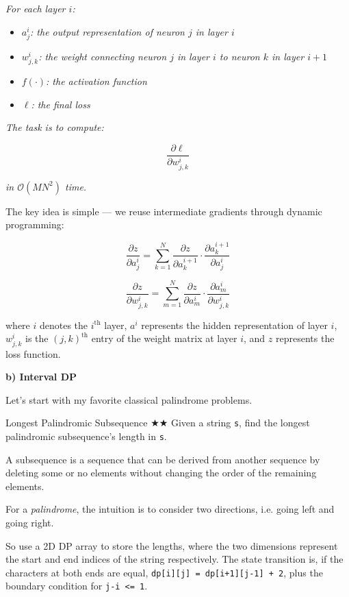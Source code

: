 \documentclass{article}
\begin{document}
\emph{For each layer $i$:}

\begin{itemize}
    \item \emph{$a^i_j$: the output representation of neuron $j$ in layer $i$}
    \item \emph{$w^i_{j,k}$: the weight connecting neuron $j$ in layer $i$ to neuron $k$ in layer $i+1$}
    \item \emph{$f(\cdot)$: the activation function}
    \item \emph{$\ell$: the final loss}
\end{itemize}

\emph{The task is to compute:}

$$
\frac{\partial \ell}{\partial w^i_{j,k}}
$$

\emph{in $\mathcal O(MN^2)$ time.}

The key idea is simple --- we reuse intermediate gradients through dynamic programming:

$$
\frac{\partial z}{\partial a^i_j}
=
\sum_{k=1}^{N}
\frac{\partial z}{\partial a^{i+1}_k}
\cdot
\frac{\partial a^{i+1}_k}{\partial a^i_j}
$$

$$
\frac{\partial z}{\partial w^i_{j,k}}
=
\sum_{m=1}^{N}
\frac{\partial z}{\partial a^i_m}
\cdot
\frac{\partial a^i_m}{\partial w^i_{j,k}}
$$

where $i$ denotes the $i^{\text{th}}$ layer, $a^i$ represents the hidden representation of layer $i$, $w^i_{j,k}$ is the $(j,k)^{\text{th}}$ entry of the weight matrix at layer $i$, and $z$ represents the loss function.






\textbf{b) Interval DP}

Let's start with my favorite classical palindrome problems.

\begin{Question}{Longest Palindromic Subsequence
 $\bigstar$$\bigstar$}
Given a string \texttt{s}, find the longest palindromic subsequence's length in \texttt{s}.

A subsequence is a sequence that can be derived from another sequence by deleting some or no elements without changing the order of the remaining elements.
\end{Question}

For a \emph{palindrome}, the intuition is to consider two directions, i.e. going left and going right.

So use a 2D DP array to store the lengths, where the two dimensions represent the start and end indices of the string respectively. The state transition is, if the characters at both ends are equal, \texttt{dp[i][j] = dp[i+1][j-1] + 2}, plus the boundary condition for \texttt{j-i <= 1}.
\end{document}
